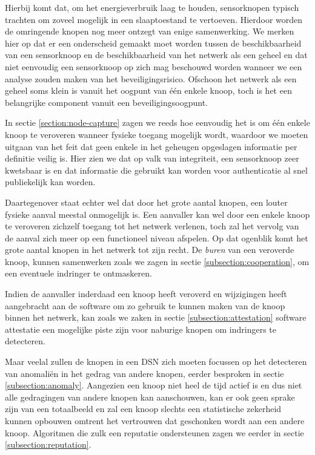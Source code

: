 Hierbij komt dat, om het energieverbruik laag te houden, sensorknopen typisch
trachten om zoveel mogelijk in een slaaptoestand te vertoeven. Hierdoor worden
de omringende knopen nog meer ontzegt van enige samenwerking. We merken hier op
dat er een onderscheid gemaakt moet worden tussen de beschikbaarheid van een
sensorknoop en de beschikbaarheid van het netwerk als een geheel en dat niet
eenvoudig een sensorknoop op zich mag beschouwd worden wanneer we een analyse
zouden maken van het beveiligingsrisico. Ofschoon het netwerk als een geheel
soms klein is vanuit het oogpunt van \'e\'en enkele knoop, toch is het een
belangrijke component vanuit een beveiligingsoogpunt.

In sectie \ref{section:node-capture} zagen we reeds hoe eenvoudig het is om
\'e\'en enkele knoop te veroveren wanneer fysieke toegang mogelijk wordt,
waardoor we moeten uitgaan van het feit dat geen enkele in het geheugen
opgeslagen informatie per definitie veilig is. Hier zien we dat op valk van
integriteit, een sensorknoop zeer kwetsbaar is en dat informatie die gebruikt
kan worden voor authenticatie al snel publiekelijk kan worden.

Daartegenover staat echter wel dat door het grote aantal knopen, een louter
fysieke aanval meestal onmogelijk is. Een aanvaller kan wel door een enkele
knoop te veroveren zichzelf toegang tot het netwerk verlenen, toch zal het
vervolg van de aanval zich meer op een functioneel niveau afspelen. Op dat
ogenblik komt het grote aantal knopen in het netwerk tot zijn recht. De
\emph{buren} van een veroverde knoop, kunnen samenwerken zoals we zagen in
sectie \ref{subsection:cooperation}, om een eventuele indringer te ontmaskeren.

Indien de aanvaller inderdaad een knoop heeft veroverd en wijzigingen heeft
aangebracht aan de software om zo gebruik te kunnen maken van de knoop binnen
het netwerk, kan zoals we zaken in sectie \ref{subsection:attestation} software
attestatie een mogelijke piste zijn voor naburige knopen om indringers te
detecteren.

Maar veelal zullen de knopen in een DSN zich moeten focussen op het detecteren
van anomali\"en in het gedrag van andere knopen, eerder besproken in sectie
\ref{subsection:anomaly}. Aangezien een knoop niet heel de tijd actief is en
dus niet alle gedragingen van andere knopen kan aanschouwen, kan er ook geen
sprake zijn van een totaalbeeld en zal een knoop slechts een statistische
zekerheid kunnen opbouwen omtrent het vertrouwen dat geschonken wordt aan een
andere knoop. Algoritmen die zulk een reputatie ondersteunen zagen we eerder in
sectie \ref{subsection:reputation}.

